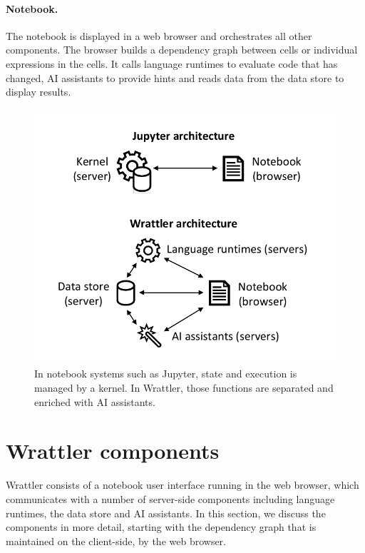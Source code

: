 \documentclass[sigplan,preprint,10pt]{acmart}\settopmatter{printfolios=true,printccs=false,printacmref=false}
\theoremstyle{plain}
\theoremstyle{definition}
\begin{document}
\paragraph{Notebook.} The notebook is displayed in a web browser and orchestrates 
all other components. The browser builds a dependency graph between cells or individual 
expressions in the cells. It calls language runtimes to evaluate code that has changed,
AI assistants to provide hints and reads data from the data store to display results.  

\begin{figure}
\vspace{-1em}
\includegraphics[scale=0.6]{diagram.pdf}
\vspace{-1em}
\caption{\small{In notebook systems such as Jupyter, state and execution is managed by a kernel. In
  Wrattler, those functions are separated and enriched with AI assistants.}}
\label{fig:arch}
\vspace{-1em}
\end{figure}

\section{Wrattler components}

Wrattler consists of a notebook user interface running in the web browser, which communicates with 
a number of server-side components including language runtimes, the data store and AI assistants. 
In this section, we discuss the components in more detail, starting with the dependency graph
that is maintained on the client-side, by the web browser.
\end{document}
